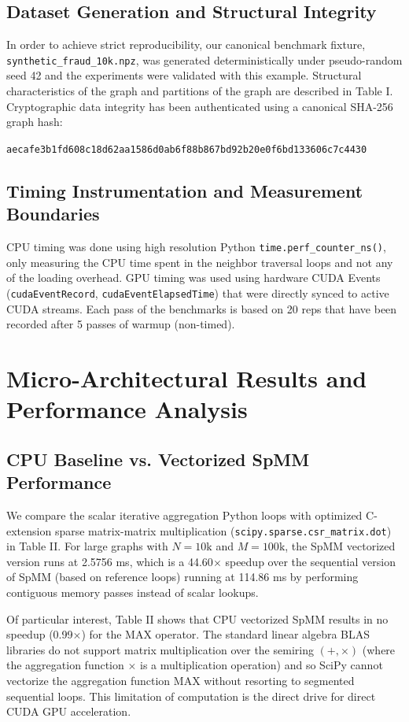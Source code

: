 \documentclass[journal]{IEEEtran}
\begin{document}
\subsection{Dataset Generation and Structural Integrity}
In order to achieve strict reproducibility, our canonical benchmark fixture, \texttt{synthetic\_fraud\_10k.npz}, was generated deterministically under pseudo-random seed 42 and the experiments were validated with this example. Structural characteristics of the graph and partitions of the graph are described in Table I. Cryptographic data integrity has been authenticated using a canonical SHA-256 graph hash:
\begin{center}
\texttt{aecafe3b1fd608c18d62aa1586d0ab6f88b867bd92b20e0f6bd133606c7c4430}
\end{center}

\subsection{Timing Instrumentation and Measurement Boundaries}
CPU timing was done using high resolution Python \texttt{time.perf\_counter\_ns()}, only measuring the CPU time spent in the neighbor traversal loops and not any of the loading overhead. GPU timing was used using hardware CUDA Events (\texttt{cudaEventRecord}, \texttt{cudaEventElapsedTime}) that were directly synced to active CUDA streams. Each pass of the benchmarks is based on 20 reps that have been recorded after 5 passes of warmup (non-timed).

\section{Micro-Architectural Results and Performance Analysis}

\subsection{CPU Baseline vs. Vectorized SpMM Performance}
We compare the scalar iterative aggregation Python loops with optimized C-extension sparse matrix-matrix multiplication (\texttt{scipy.sparse.csr\_matrix.dot}) in Table II. For large graphs with $N = 10\text{k}$ and $M = 100\text{k}$, the SpMM vectorized version runs at 2.5756 ms, which is a 44.60$\times$ speedup over the sequential version of SpMM (based on reference loops) running at 114.86 ms by performing contiguous memory passes instead of scalar lookups.

Of particular interest, Table II shows that CPU vectorized SpMM results in no speedup (0.99$\times$) for the MAX operator. The standard linear algebra BLAS libraries do not support matrix multiplication over the semiring $(+, \times)$ (where the aggregation function $\times$ is a multiplication operation) and so SciPy cannot vectorize the aggregation function MAX without resorting to segmented sequential loops. This limitation of computation is the direct drive for direct CUDA GPU acceleration.
\end{document}

